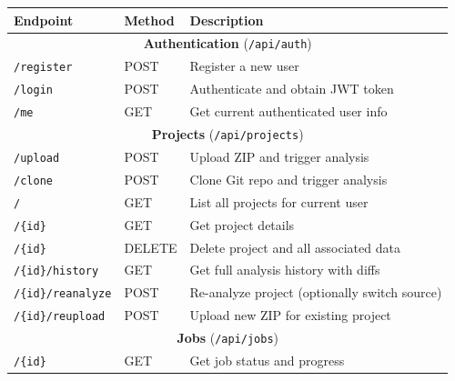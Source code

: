 \begin{table}[htbp]
    \centering
    \footnotesize
    \begin{tabular}{|l|l|p{6cm}|}
        \hline
        \textbf{Endpoint}          & \textbf{Method} & \textbf{Description}                             \\
        \hline\hline
        \multicolumn{3}{|c|}{\textbf{Authentication} (\texttt{/api/auth})} \\
        \hline
        \texttt{/register}         & POST            & Register a new user                              \\
        \hline
        \texttt{/login}            & POST            & Authenticate and obtain JWT token                \\
        \hline
        \texttt{/me}               & GET             & Get current authenticated user info              \\
        \hline\hline
        \multicolumn{3}{|c|}{\textbf{Projects} (\texttt{/api/projects})} \\
        \hline
        \texttt{/upload}           & POST            & Upload ZIP and trigger analysis                  \\
        \hline
        \texttt{/clone}            & POST            & Clone Git repo and trigger analysis              \\
        \hline
        \texttt{/}                 & GET             & List all projects for current user               \\
        \hline
        \texttt{/\{id\}}           & GET             & Get project details                              \\
        \hline
        \texttt{/\{id\}}           & DELETE          & Delete project and all associated data           \\
        \hline
        \texttt{/\{id\}/history}   & GET             & Get full analysis history with diffs             \\
        \hline
        \texttt{/\{id\}/reanalyze} & POST            & Re-analyze project (optionally switch source)    \\
        \hline
        \texttt{/\{id\}/reupload}  & POST            & Upload new ZIP for existing project              \\
        \hline\hline
        \multicolumn{3}{|c|}{\textbf{Jobs} (\texttt{/api/jobs})} \\
        \hline
        \texttt{/\{id\}}           & GET             & Get job status and progress                      \\

\end{tabular}
\end{table}

